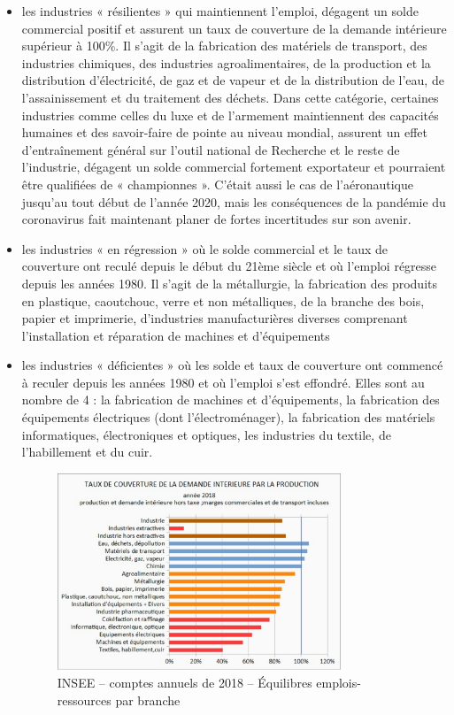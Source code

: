 \documentclass[a4paper]{article}
\begin{document}
\begin{itemize}
\item les industries « résilientes » qui maintiennent l’emploi, dégagent un solde commercial positif et assurent un taux de couverture de la demande intérieure supérieur à 100\%. Il s’agit de la fabrication des matériels de transport, des industries chimiques, des industries agroalimentaires, de la production et la distribution d’électricité, de gaz et de vapeur et de la distribution de l’eau, de l’assainissement et du traitement des déchets. Dans cette catégorie, certaines industries comme celles du luxe et de  l’armement maintiennent des capacités humaines et des savoir-faire de pointe au niveau mondial, assurent un effet d’entraînement général sur l’outil national de Recherche et le reste de l’industrie, dégagent un solde commercial fortement exportateur  et pourraient être qualifiées de « championnes ». C’était aussi le cas de l’aéronautique jusqu’au tout début de l’année 2020, mais les conséquences de la pandémie du coronavirus fait maintenant planer de fortes incertitudes sur son avenir.
 
\item les industries « en régression » où le solde commercial et le taux de couverture ont reculé depuis le début du 21ème siècle et où l’emploi régresse depuis les années 1980. Il s’agit de  la métallurgie, la fabrication des produits en plastique, caoutchouc, verre et non métalliques, de la branche des bois, papier et imprimerie, d’industries manufacturières diverses comprenant l’installation et réparation de machines et d’équipements 

\item les industries « déficientes » où les solde et taux de couverture ont commencé à reculer depuis les années 1980 et où l’emploi s’est effondré.  Elles sont au nombre de 4 : la fabrication de machines et d’équipements, la fabrication des équipements électriques (dont l’électroménager), la fabrication des matériels informatiques, électroniques et optiques, les industries du textile, de l’habillement et du cuir. 

\begin{figure}[H]
    \centering
    \includegraphics*[width=0.8\textwidth]{images/couverture}
    \caption{INSEE – comptes annuels de 2018 – Équilibres emplois-ressources par branche}
    \label{fig:couverture}
\end{figure}



\end{itemize}
\end{document}
